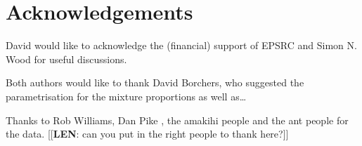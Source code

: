 \documentclass[useAMS,referee, usegraphicx]{biom}
\begin{document}

\section*{Acknowledgements}

David would like to acknowledge the (financial) support of EPSRC and Simon N. Wood for useful discussions.

Both authors would like to thank David Borchers, who suggested the parametrisation for the mixture proportions as well as\ldots

Thanks to Rob Williams, Dan Pike , the amakihi people and the ant people for the data. [[\textbf{LEN}: can you put in the right people to thank here?]]



\end{document}

